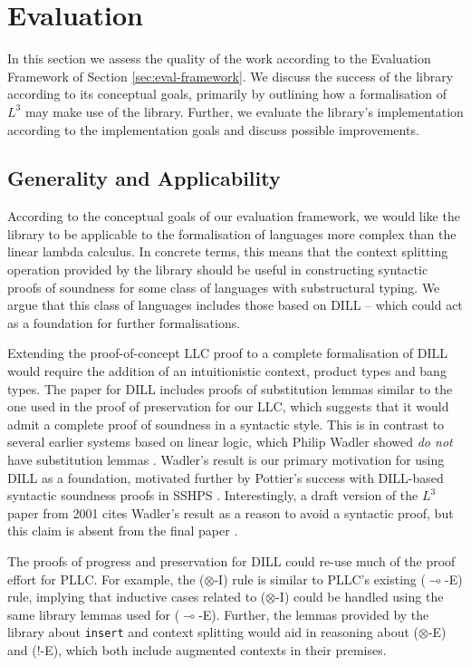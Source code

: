 \documentclass[]{unswthesis}
\newcommand{\lolly}{\multimap}
\let\c\texttt
\let\i\textit
\begin{document}
\chapter{Evaluation}
\label{chap:eval}

In this section we assess the quality of the work according to the Evaluation Framework of Section \cref{sec:eval-framework}. We discuss the success of the library according to its conceptual goals, primarily by outlining how a formalisation of $L^3$ may make use of the library. Further, we evaluate the library's implementation according to the implementation goals and discuss possible improvements.

\section{Generality and Applicability}
\label{sec:generality}

According to the conceptual goals of our evaluation framework, we would like the library to be applicable to the formalisation of languages more complex than the linear lambda calculus. In concrete terms, this means that the context splitting operation provided by the library should be useful in constructing syntactic proofs of soundness for some class of languages with substructural typing. We argue that this class of languages includes those based on DILL -- which could act as a foundation for further formalisations.

Extending the proof-of-concept LLC proof to a complete formalisation of DILL would require the addition of an intuitionistic context, product types and bang types. The paper for DILL \cite{barber96} includes proofs of substitution lemmas similar to the one used in the proof of preservation for our LLC, which suggests that it would admit a complete proof of soundness in a syntactic style. This is in contrast to several earlier systems based on linear logic, which Philip Wadler showed \i{do not} have substitution lemmas \cite{wadlerNoSubst}. Wadler's result is our primary motivation for using DILL as a foundation, motivated further by Pottier's success with DILL-based syntactic soundness proofs in SSHPS \cite{pottier13}. Interestingly, a draft version of the $L^3$ paper from 2001 cites Wadler's result as a reason to avoid a syntactic proof, but this claim is absent from the final paper \cite{ahmed05}.

The proofs of progress and preservation for DILL could re-use much of the proof effort for PLLC. For example, the ($\otimes$-I) rule is similar to PLLC's existing ($\lolly$-E) rule, implying that inductive cases related to ($\otimes$-I) could be handled using the same library lemmas used for ($\lolly$-E). Further, the lemmas provided by the library about \c{insert} and context splitting would aid in reasoning about ($\otimes$-E) and (!-E), which both include augmented contexts in their premises.
\end{document}
